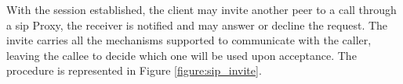 With the session established, the client may invite another peer to a call through a \gls{sip} Proxy, the receiver is notified and may answer or decline the request. The invite carries all the mechanisms supported to communicate with the caller, leaving the callee to decide which one will be used upon acceptance. The procedure is represented in Figure \ref{figure:sip_invite}.

\FloatBarrier
